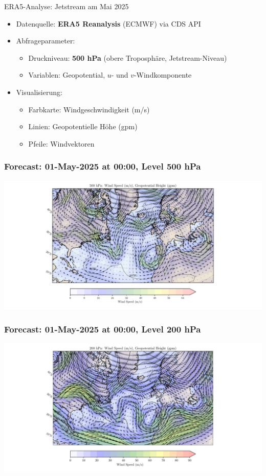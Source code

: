 \begin{frame}{ERA5-Analyse: Jetstream am Mai 2025}
	\begin{itemize}
		\item Datenquelle: \textbf{ERA5 Reanalysis} (ECMWF) via CDS API
		\item Abfrageparameter:
		      \begin{itemize}
			      \item Druckniveau: \textbf{500 hPa} (obere Troposphäre, Jetstream-Niveau)
			      \item Variablen: Geopotential, \( u \)- und \( v \)-Windkomponente
		      \end{itemize}
		\item Visualisierung:
		      \begin{itemize}
			      \item Farbkarte: Windgeschwindigkeit (m/s)
			      \item Linien: Geopotentielle Höhe (gpm)
			      \item Pfeile: Windvektoren
		      \end{itemize}
	\end{itemize}
\end{frame}

\begin{frame}
	\frametitle{Forecast: 01-May-2025 at 00:00, Level 500 hPa}
	\includegraphics[width=\textwidth]{../images/weather/data_2025_5_1_00:00_500.pdf}
\end{frame}
\begin{frame}
	\frametitle{Forecast: 01-May-2025 at 00:00, Level 200 hPa}
	\includegraphics[width=\textwidth]{../images/weather/data_2025_5_1_00:00_200.pdf}
\end{frame}

